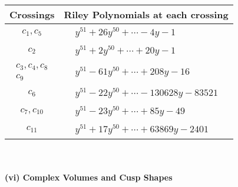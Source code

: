 \documentclass[1p]{elsarticle_modified}
\theoremstyle{definition}
\begin{document}
\begin{tabular}{m{50pt}|m{274pt}}
Crossings & \hspace{64pt}Riley Polynomials at each crossing \\
\hline $$\begin{aligned}c_{1},c_{5}\end{aligned}$$&$\begin{aligned}
&y^{51}+26 y^{50}+\cdots-4 y-1
\end{aligned}$\\
\hline $$\begin{aligned}c_{2}\end{aligned}$$&$\begin{aligned}
&y^{51}+2 y^{50}+\cdots+20 y-1
\end{aligned}$\\
\hline $$\begin{aligned}c_{3},c_{4},c_{8}\\c_{9}\end{aligned}$$&$\begin{aligned}
&y^{51}-61 y^{50}+\cdots+208 y-16
\end{aligned}$\\
\hline $$\begin{aligned}c_{6}\end{aligned}$$&$\begin{aligned}
&y^{51}-22 y^{50}+\cdots-130628 y-83521
\end{aligned}$\\
\hline $$\begin{aligned}c_{7},c_{10}\end{aligned}$$&$\begin{aligned}
&y^{51}-23 y^{50}+\cdots+85 y-49
\end{aligned}$\\
\hline $$\begin{aligned}c_{11}\end{aligned}$$&$\begin{aligned}
&y^{51}+17 y^{50}+\cdots+63869 y-2401
\end{aligned}$\\
\hline
\end{tabular}\\~\\
\newpage\flushleft \textbf{(vi) Complex Volumes and Cusp Shapes}
\end{document}
